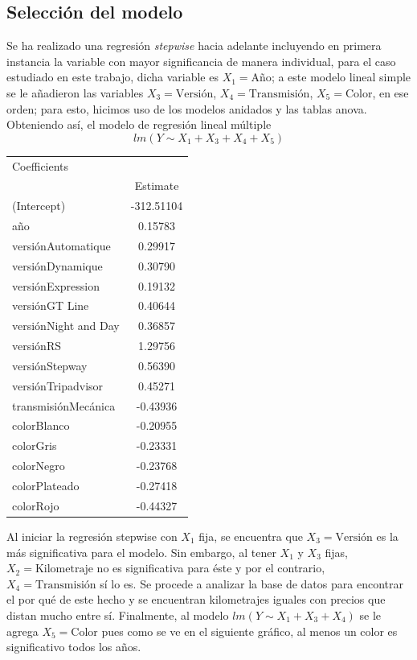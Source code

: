 \documentclass[12pt,a0,portrait]{a0poster}
\begin{document}
\begin{multicols}{2}
\section*{\textcolor{ginger}{\huge Selecci\'on del modelo}}

Se ha realizado una regresi\'on \textit{stepwise} hacia adelante incluyendo en primera instancia la variable con mayor significancia de manera individual, para el caso estudiado en este trabajo, dicha variable es $X_1=\text{A\~no}$; a este modelo lineal simple se le a\~nadieron las variables $X_3=\text{Versi\'on}$, $X_4=\text{Transmisi\'on}$, $X_5=\text{Color}$, en ese orden; para esto, hicimos uso de los modelos anidados y las tablas anova. Obteniendo as\'i, el modelo de regresi\'on lineal m\'ultiple $$lm(Y \sim X_{1} + X_{3} + X_{4} + X_{5})$$ 

\begin{center}

\begin{tabular}{l c}
	Coefficients  &           \\
	              & Estimate    \\
	(Intercept)   &-312.51104 \\
	a\~no         &   0.15783\\
	versi\'onAutomatique  &   0.29917 \\ 
	versi\'onDynamique    &   0.30790\\ 
	versi\'onExpression   &   0.19132 \\ 
	versi\'onGT Line      &   0.40644  \\ 
	versi\'onNight and Day&   0.36857\\ 
	versi\'onRS           &   1.29756 \\
	versi\'onStepway      &   0.56390  \\ 
	versi\'onTripadvisor  &   0.45271\\
	transmisi\'onMec\'anica     &  -0.43936 \\ 
	colorBlanco       &  -0.20955  \\ 
	colorGris         &  -0.23331  \\ 
	colorNegro        &  -0.23768  \\  
	colorPlateado     &  -0.27418   \\  
	colorRojo         &  -0.44327 \\ 

\end{tabular}
\end{center} 

Al iniciar la regresi\'on stepwise con $X_{1}$ fija, se encuentra que $X_3=\text{Versi\'on}$ es la m\'as significativa para el modelo. Sin embargo, al tener $X_{1}$ y $X_{3}$ fijas, $X_2=\text{Kilometraje}$ no es significativa para \'este y por el contrario, $X_4=\text{Transmisi\'on}$ s\'i lo es. Se procede a analizar la base de datos para encontrar el por qu\'e de este hecho y se encuentran kilometrajes iguales con precios que distan mucho entre s\'i. Finalmente, al modelo $lm(Y\sim  X_{1} + X_{3} + X_{4})$ se le agrega $X_{5}=\text{Color}$ pues como se ve en el siguiente gr\'afico, al menos un color es significativo todos los a\~nos.


\end{multicols}
\end{document}
